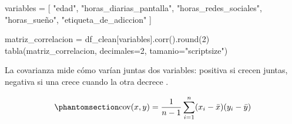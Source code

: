 \documentclass[11pt,spanish,a4paper,]{article}
\newenvironment{Shaded}{\begin{snugshade}}{\end{snugshade}}
\newcommand{\BuiltInTok}[1]{\textcolor[rgb]{0.00,0.23,0.31}{#1}}
\newcommand{\DecValTok}[1]{\textcolor[rgb]{0.68,0.00,0.00}{#1}}
\newcommand{\NormalTok}[1]{\textcolor[rgb]{0.00,0.23,0.31}{#1}}
\newcommand{\OperatorTok}[1]{\textcolor[rgb]{0.37,0.37,0.37}{#1}}
\newcommand{\StringTok}[1]{\textcolor[rgb]{0.13,0.47,0.30}{#1}}
\begin{document}
\newpage

\begin{Shaded}
\begin{Highlighting}[]
\NormalTok{variables }\OperatorTok{=}\NormalTok{ [}
    \StringTok{"edad"}\NormalTok{,}
    \StringTok{"horas\_diarias\_pantalla"}\NormalTok{,}
    \StringTok{"horas\_redes\_sociales"}\NormalTok{,}
    \StringTok{"horas\_sueño"}\NormalTok{,}
    \StringTok{"etiqueta\_de\_adiccion"}
\NormalTok{]}

\NormalTok{matriz\_correlacion }\OperatorTok{=}\NormalTok{ df\_clean[variables].corr().}\BuiltInTok{round}\NormalTok{(}\DecValTok{2}\NormalTok{)}
\NormalTok{tabla(matriz\_correlacion, decimales}\OperatorTok{=}\DecValTok{2}\NormalTok{, tamanio}\OperatorTok{=}\StringTok{"scriptsize"}\NormalTok{)}
\end{Highlighting}
\end{Shaded}

\begin{table}

\caption{\label{tbl-matriz-correlacion}Matriz de correlación entre las
variables numéricas.}


\end{table}%

La covarianza mide cómo varían juntas dos variables: positiva si crecen
juntas, negativa si una crece cuando la otra decrece
\autocite{walpole2012probabilidad}.

\begin{equation}\protect\phantomsection\label{eq-covarianza}{
\text{cov}(x,y) = \frac{1}{n-1}\sum_{i=1}^{n}(x_i-\bar{x})(y_i-\bar{y})
}\end{equation}
\end{document}
